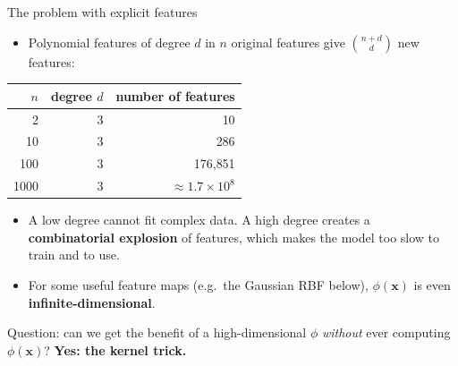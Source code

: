 \documentclass[aspectratio=169,10pt]{beamer}
\newcommand{\x}{\mathbf{x}}
\begin{document}
\begin{frame}{The problem with explicit features}
\small
\begin{itemize}
  \item Polynomial features of degree $d$ in $n$ original features give $\binom{n+d}{d}$ new features:
\end{itemize}
\begin{center}
\begin{tabular}{@{}rrr@{}}
\toprule
$n$ & degree $d$ & number of features \\
\midrule
2 & 3 & 10 \\
10 & 3 & 286 \\
100 & 3 & 176{,}851 \\
1000 & 3 & $\approx 1.7\times 10^{8}$ \\
\bottomrule
\end{tabular}
\end{center}
\begin{itemize}
  \item A low degree cannot fit complex data. A high degree creates a \textbf{combinatorial explosion} of features, which makes the model too slow to train and to use.
  \item For some useful feature maps (e.g.\ the Gaussian RBF below), $\phi(\x)$ is even \textbf{infinite-dimensional}.
\end{itemize}
\vspace{4pt}
\alert{Question:} can we get the benefit of a high-dimensional $\phi$ \emph{without} ever computing $\phi(\x)$? \textbf{Yes: the kernel trick.}
\end{frame}
\end{document}
